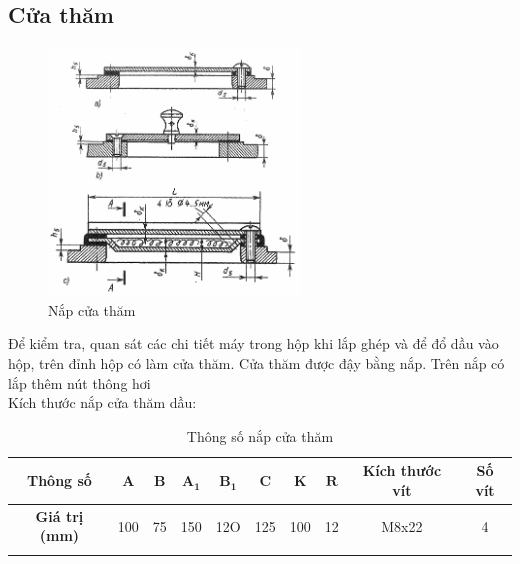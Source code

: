         \subsection{Cửa thăm}
            \begin{figure}[H]
                \centering
                \includegraphics[width=0.6\textwidth]{pictures/oil_dipstick_cap.png}
                \caption{Nắp cửa thăm}
                \label{oil_dipstick_cap}
            \end{figure}
            \hspace*{0.6cm}Để kiểm tra, quan sát các chi tiết máy trong hộp khi lắp ghép và để đổ dầu vào hộp, trên đỉnh hộp có làm cửa thăm. Cửa thăm được đậy bằng nắp. Trên nắp có lắp thêm nút thông hơi \\
            \hspace*{0.6cm}Kích thước nắp cửa thăm dầu:
            \begin{longtable}{|c|c|c|c|c|c|c|c|c|c|}
                \hline
                \textbf{Thông số} & $\mathbf{A}$ & $\mathbf{B}$ & $\mathbf{A_1}$ & $\mathbf{B_1}$ & $\mathbf{C}$ & $\mathbf{K}$ & $\mathbf{R}$ & \textbf{Kích thước vít} & \textbf{Số vít}\\
                \hline
                \textbf{Giá trị (mm)} & 100 & 75 & 150 & 12O & 125 & 100 & 12 & M8x22 & 4 \\
                \hline
                \caption{Thông số nắp cửa thăm}
            \end{longtable}
